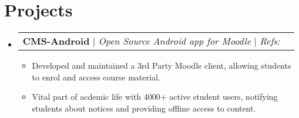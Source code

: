 \documentclass[a4paper,11pt]{article}
\makeatletter
\newcommand{\resumeItem}[1]{
  \item\small{
    {#1 \vspace{-2pt}}
  }
}
\newcommand{\resumeProjectHeading}[2]{
    \item
    \begin{tabular*}{0.97\textwidth}{l@{\extracolsep{\fill}}r}
      \small#1 & #2 \\
    \end{tabular*}\vspace{-7pt}
}
\newcommand{\resumeSubHeadingListStart}{\begin{itemize}[leftmargin=0.15in, label={}]}
\newcommand{\resumeSubHeadingListEnd}{\end{itemize}}
\newcommand{\resumeItemListStart}{\begin{itemize}}
\newcommand{\resumeItemListEnd}{\end{itemize}\vspace{-5pt}}
\makeatother
\begin{document}
\section{Projects}
    \resumeSubHeadingListStart
      \resumeProjectHeading
          {\textbf{CMS-Android} $|$ \emph{Open Source Android app for Moodle} $|$ \textit{Refs:} {\href{https://github.com/crux-bphc/CMS-Android}{\normalcolor\faGithub\;}
            \href{https://play.google.com/store/apps/details?id=crux.bphc.cms}{\normalcolor\faPlay\;}}}{}
          \resumeItemListStart
						\resumeItem{Developed and maintained a 3rd Party Moodle client, allowing students to enrol and access course material.}
						\resumeItem{Vital part of acdemic life with 4000+ active student users, notifying students about notices and providing offline access to content.}
          \resumeItemListEnd
    \resumeSubHeadingListEnd

\end{document}
